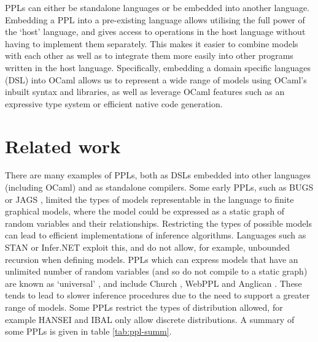 PPLs can either be standalone languages or be embedded into another language. Embedding a PPL into a pre-existing language allows utilising the full power of the `host' language, and gives access to operations in the host language without having to implement them separately. This makes it easier to combine models with each other as well as to integrate them more easily into other programs written in the host language. Specifically, embedding a domain specific languages (DSL) into OCaml allows us to represent a wide range of models using OCaml's inbuilt syntax and libraries, as well as leverage OCaml features such as an expressive type system or efficient native code generation.

\section{Related work}
There are many examples of PPLs, both as DSLs embedded into other languages (including OCaml) and as standalone compilers. Some early PPLs, such as BUGS \cite{gilks1994bugs} or JAGS \cite{plummer2004jags}, limited the types of models representable in the language to finite graphical models, where the model could be expressed as a static graph of random variables and their relationships. Restricting the types of possible models can lead to efficient implementations of inference algorithms. Languages such as STAN \cite{carpenter2017stan} or Infer.NET \cite{wang2011using} exploit this, and do not allow, for example, unbounded recursion when defining models. PPLs which can express models that have an unlimited number of random variables (and so do not compile to a static graph) are known as `universal' \cite{borgstrom2016lambda}, and include Church \cite{goodman2012church}, WebPPL \cite{mobus2018structure} and Anglican \cite{anglican-smc}. These tends to lead to slower inference procedures due to the need to support a greater range of models. Some PPLs restrict the types of distribution allowed, for example HANSEI \cite{kiselyov2009embedded} and IBAL \cite{ibal} only allow discrete distributions. A summary of some PPLs is given in table \ref{tab:ppl-summ}.


